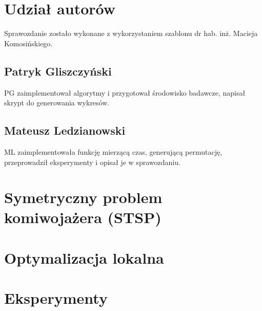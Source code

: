 \documentclass{article}
\begin{document}


\section*{Udział autorów}

Sprawozdanie zostało wykonane z wykorzystaniem szablonu dr hab. inż. Macieja Komosińskiego. \cite{MiOIB}

\subsection*{Patryk Gliszczyński}
PG zaimplementował algorytmy i przygotował środowisko badawcze, napisał skrypt do generowania wykresów.

\subsection*{Mateusz Ledzianowski}
ML zaimplementowała funkcję mierzącą czas, generującą permutację, przeprowadził eksperymenty i opisał je w sprawozdaniu.

\clearpage

\section{Symetryczny problem komiwojażera (STSP)}


\clearpage

\section{Optymalizacja lokalna}


\clearpage

\section{Eksperymenty}
\end{document}

